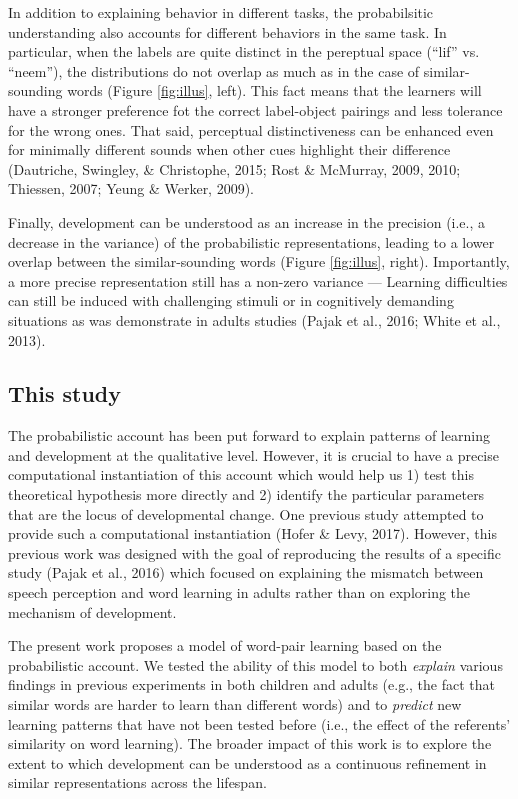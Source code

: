 \documentclass[english,,man,floatsintext]{apa6}
\theoremstyle{definition}
\theoremstyle{definition}
\theoremstyle{definition}
\theoremstyle{remark}
\begin{document}
In addition to explaining behavior in different tasks, the probabilsitic
understanding also accounts for different behaviors in the same task. In
particular, when the labels are quite distinct in the pereptual space
(\enquote{lif} vs. \enquote{neem}), the distributions do not overlap as
much as in the case of similar-sounding words (Figure \ref{fig:illus},
left). This fact means that the learners will have a stronger preference
fot the correct label-object pairings and less tolerance for the wrong
ones. That said, perceptual distinctiveness can be enhanced even for
minimally different sounds when other cues highlight their difference
(Dautriche, Swingley, \& Christophe, 2015; Rost \& McMurray, 2009, 2010;
Thiessen, 2007; Yeung \& Werker, 2009).

Finally, development can be understood as an increase in the precision
(i.e., a decrease in the variance) of the probabilistic representations,
leading to a lower overlap between the similar-sounding words (Figure
\ref{fig:illus}, right). Importantly, a more precise representation
still has a non-zero variance --- Learning difficulties can still be
induced with challenging stimuli or in cognitively demanding situations
as was demonstrate in adults studies (Pajak et al., 2016; White et al.,
2013).

\subsection{This study}\label{this-study}

The probabilistic account has been put forward to explain patterns of
learning and development at the qualitative level. However, it is
crucial to have a precise computational instantiation of this account
which would help us 1) test this theoretical hypothesis more directly
and 2) identify the particular parameters that are the locus of
developmental change. One previous study attempted to provide such a
computational instantiation (Hofer \& Levy, 2017). However, this
previous work was designed with the goal of reproducing the results of a
specific study (Pajak et al., 2016) which focused on explaining the
mismatch between speech perception and word learning in adults rather
than on exploring the mechanism of development.

The present work proposes a model of word-pair learning based on the
probabilistic account. We tested the ability of this model to both
\emph{explain} various findings in previous experiments in both children
and adults (e.g., the fact that similar words are harder to learn than
different words) and to \emph{predict} new learning patterns that have
not been tested before (i.e., the effect of the referents' similarity on
word learning). The broader impact of this work is to explore the extent
to which development can be understood as a continuous refinement in
similar representations across the lifespan.
\end{document}
